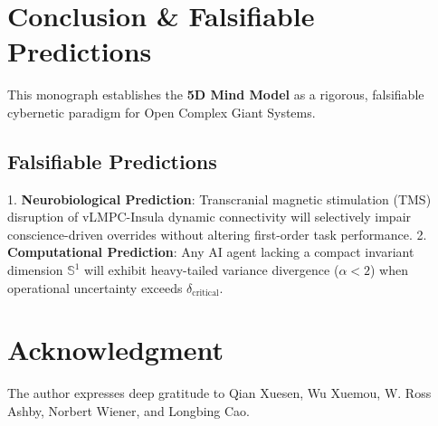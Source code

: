 \documentclass[journal,twocolumn,10pt]{IEEEtran}
\begin{document}
\begin{table}[htbp]
\caption{Computational Benchmark Performance Across Governance Models}
\label{tab:ai_benchmarks}
\centering
{}
\end{table}

\section{Conclusion \& Falsifiable Predictions}
This monograph establishes the \textbf{5D Mind Model} as a rigorous, falsifiable cybernetic paradigm for Open Complex Giant Systems. 

\subsection{Falsifiable Predictions}
1. \textbf{Neurobiological Prediction}: Transcranial magnetic stimulation (TMS) disruption of vLMPC-Insula dynamic connectivity will selectively impair conscience-driven overrides without altering first-order task performance.
2. \textbf{Computational Prediction}: Any AI agent lacking a compact invariant dimension $\mathbb{S}^1$ will exhibit heavy-tailed variance divergence ($\alpha < 2$) when operational uncertainty exceeds $\delta_{\text{critical}}$.

\section*{Acknowledgment}
The author expresses deep gratitude to Qian Xuesen, Wu Xuemou, W. Ross Ashby, Norbert Wiener, and Longbing Cao.
\end{document}
